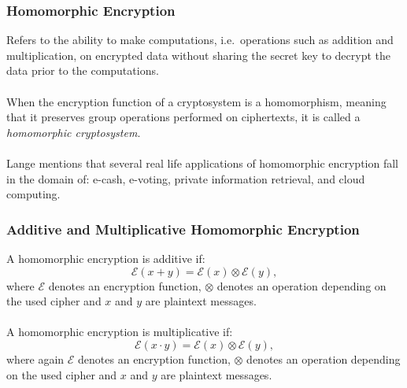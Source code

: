\documentclass{beamer}
\begin{document}
\begin{frame}
\frametitle{Homomorphic Encryption}
Refers to the ability to make computations, i.e.\ operations such as addition and multiplication, on encrypted data without sharing the secret key to decrypt the data prior to the computations. \\~\\

When the encryption function of a cryptosystem is a homomorphism, meaning that it preserves group operations performed on ciphertexts, it is called a \emph{homomorphic cryptosystem}. \\~\\

Lange \cite{lange2011} mentions that several real life applications of homomorphic encryption fall in the domain of: e-cash, e-voting, private information retrieval, and cloud computing.

\end{frame}

\begin{frame}
\frametitle{Additive and Multiplicative Homomorphic Encryption}

A homomorphic encryption is additive if:
\begin{equation}
\mathcal{E}(x+y) = \mathcal{E}(x)\otimes \mathcal{E}(y),
\end{equation}
where $\mathcal{E}$ denotes an encryption function, $\otimes$ denotes an operation depending on the used cipher and $x$ and $y$ are plaintext messages. \\~\\

A homomorphic encryption is multiplicative if:
\begin{equation}
\mathcal{E}(x \cdot y) = \mathcal{E}(x) \otimes \mathcal{E}(y),
\end{equation}
where again $\mathcal{E}$ denotes an encryption function, $\otimes$ denotes an operation depending on the used cipher and $x$ and $y$ are plaintext messages.

\end{frame}
\end{document}
